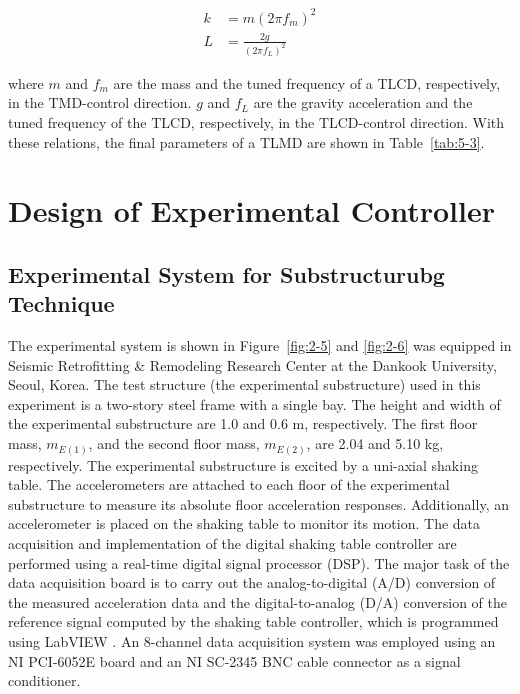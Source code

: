 \begin{align}
k&=m\left(2\pi f_{m}\right)^{2} \label{eq:5-1} \\
L&=\frac{2g}{\left(2\pi f_{L}\right)^{2}} \label{eq:5-2}
\end{align}

where $m$ and $f_{m}$ are the mass and the tuned frequency of a TLCD, respectively, in the TMD-control direction. $g$ and $f_{L}$ are the gravity acceleration and the tuned frequency of the TLCD, respectively, in the TLCD-control direction. With these relations, the final parameters of a TLMD are shown in Table~\ref{tab:5-3}.








\clearpage
\section{Design of Experimental Controller}
\subsection{Experimental System for Substructurubg Technique}

The experimental system is shown in Figure~\ref{fig:2-5} and \ref{fig:2-6} was equipped in Seismic Retrofitting \& Remodeling Research Center at the Dankook University, Seoul, Korea. The test structure (the experimental substructure) used in this experiment is a two-story steel frame with a single bay. The height and width of the experimental substructure are 1.0 and 0.6 m, respectively. The first floor mass, $m_{E(1)}$, and the second floor mass, $m_{E(2)}$, are 2.04 and 5.10 kg, respectively. The experimental substructure is excited by a uni-axial shaking table. The accelerometers are attached to each floor of the experimental substructure to measure its absolute floor acceleration responses. Additionally, an accelerometer is placed on the shaking table to monitor its motion. The data acquisition and implementation of the digital shaking table controller are performed using a real-time digital signal processor (DSP). The major task of the data acquisition board is to carry out the analog-to-digital (A/D) conversion of the measured acceleration data and the digital-to-analog (D/A) conversion of the reference signal computed by the shaking table controller, which is programmed using LabVIEW \citep{bishop2007labview}. An 8-channel data acquisition system was employed using an NI PCI-6052E board and an NI SC-2345 BNC cable connector as a signal conditioner.

